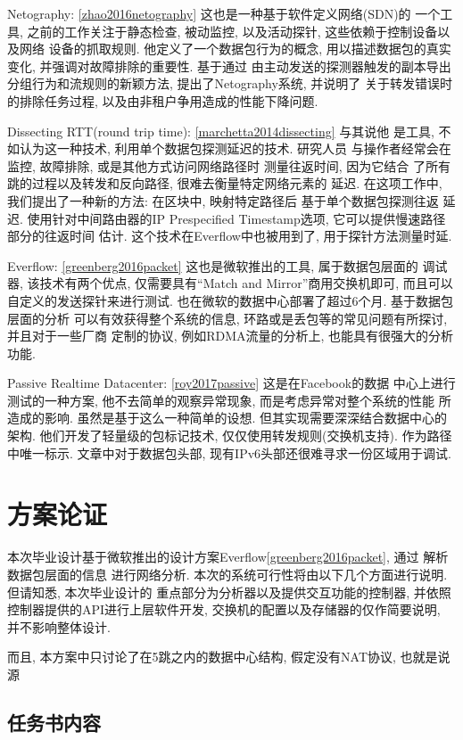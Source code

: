 {\begin{mdframed}[everyline=true]
Netography: \ref{zhao2016netography} 这也是一种基于软件定义网络(SDN)的
一个工具, 之前的工作关注于静态检查, 被动监控, 以及活动探针,
这些依赖于控制设备以及网络 设备的抓取规则. 他定义了一个数据包行为的概念,
用以描述数据包的真实变化, 并强调对故障排除的重要性. 基于通过
由主动发送的探测器触发的副本导出分组行为和流规则的新颖方法,
提出了Netography系统, 并说明了 关于转发错误时的排除任务过程,
以及由非租户争用造成的性能下降问题.

Dissecting RTT(round trip time): \ref{marchetta2014dissecting} 与其说他
是工具, 不如认为这一种技术, 利用单个数据包探测延迟的技术. 研究人员
与操作者经常会在监控, 故障排除, 或是其他方式访问网络路径时 测量往返时间,
因为它结合 了所有跳的过程以及转发和反向路径, 很难去衡量特定网络元素的
延迟. 在这项工作中, 我们提出了一种新的方法: 在区块中, 映射特定路径后
基于单个数据包探测往返 延迟. 使用针对中间路由器的IP Prespecified
Timestamp选项, 它可以提供慢速路径部分的往返时间 估计.
这个技术在Everflow中也被用到了, 用于探针方法测量时延.

Everflow: \ref{greenberg2016packet} 这也是微软推出的工具,
属于数据包层面的 调试器, 该技术有两个优点, 仅需要具有``Match and
Mirror''商用交换机即可, 而且可以 自定义的发送探针来进行测试.
也在微软的数据中心部署了超过6个月. 基于数据包层面的分析
可以有效获得整个系统的信息, 环路或是丢包等的常见问题有所探讨,
并且对于一些厂商 定制的协议, 例如RDMA流量的分析上,
也能具有很强大的分析功能.

Passive Realtime Datacenter: \ref{roy2017passive} 这是在Facebook的数据
中心上进行测试的一种方案, 他不去简单的观察异常现象,
而是考虑异常对整个系统的性能 所造成的影响. 虽然是基于这么一种简单的设想.
但其实现需要深深结合数据中心的架构. 他们开发了轻量级的包标记技术,
仅仅使用转发规则(交换机支持). 作为路径中唯一标示. 文章中对于数据包头部,
现有IPv6头部还很难寻求一份区域用于调试.

\section{方案论证}

本次毕业设计基于微软推出的设计方案Everflow\ref{greenberg2016packet},
通过 解析数据包层面的信息 进行网络分析.
本次的系统可行性将由以下几个方面进行说明. 但请知悉, 本次毕业设计的
重点部分为分析器以及提供交互功能的控制器,
并依照控制器提供的API进行上层软件开发,
交换机的配置以及存储器的仅作简要说明, 并不影响整体设计.

而且, 本方案中只讨论了在5跳之内的数据中心结构, 假定没有NAT协议,
也就是说源

\subsection{任务书内容}


\end{mdframed}}
